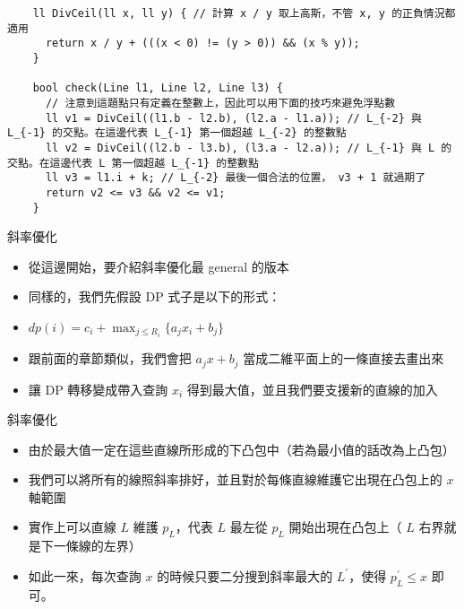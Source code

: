\documentclass[standalone]{beamer}
\begin{document}
\begin{frame}[fragile]{}
  \begin{verbatim}
    ll DivCeil(ll x, ll y) { // 計算 x / y 取上高斯，不管 x, y 的正負情況都適用
      return x / y + (((x < 0) != (y > 0)) && (x % y));
    }

    bool check(Line l1, Line l2, Line l3) {
      // 注意到這題點只有定義在整數上，因此可以用下面的技巧來避免浮點數
      ll v1 = DivCeil((l1.b - l2.b), (l2.a - l1.a)); // L_{-2} 與 L_{-1} 的交點。在這邊代表 L_{-1} 第一個超越 L_{-2} 的整數點
      ll v2 = DivCeil((l2.b - l3.b), (l3.a - l2.a)); // L_{-1} 與 L 的交點。在這邊代表 L 第一個超越 L_{-1} 的整數點
      ll v3 = l1.i + k; // L_{-2} 最後一個合法的位置， v3 + 1 就過期了
      return v2 <= v3 && v2 <= v1;
    }
  \end{verbatim}
\end{frame}

\begin{frame}{斜率優化}
  \begin{itemize}
    \item 從這邊開始，要介紹斜率優化最 general 的版本
    \item 同樣的，我們先假設 DP 式子是以下的形式：
    \item $dp(i) = c_i + \max_{j \leq R_i} \{a_jx_i + b_j\}$
    \item 跟前面的章節類似，我們會把 $a_jx + b_j$ 當成二維平面上的一條直接去畫出來
    \item 讓 DP 轉移變成帶入查詢 $x_i$ 得到最大值，並且我們要支援新的直線的加入
  \end{itemize}
\end{frame}

\begin{frame}{斜率優化}
  \begin{itemize}
    \item 由於最大值一定在這些直線所形成的下凸包中（若為最小值的話改為上凸包）
    \item 我們可以將所有的線照斜率排好，並且對於每條直線維護它出現在凸包上的 $x$ 軸範圍
    \item 實作上可以直線 $L$ 維護 $p_L$，代表 $L$ 最左從 $p_L$ 開始出現在凸包上（ $L$ 右界就是下一條線的左界）
    \item 如此一來，每次查詢 $x$ 的時候只要二分搜到斜率最大的 $L^\prime$，使得 $p_L^\prime \leq x$ 即可。
  \end{itemize}
\end{frame}
\end{document}
